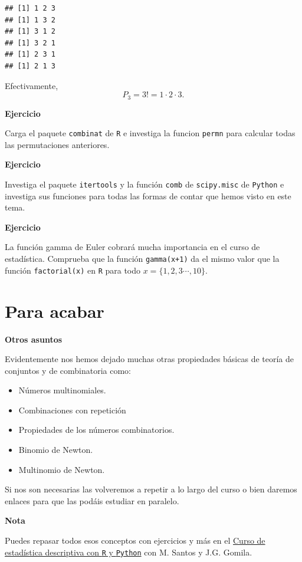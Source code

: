\documentclass[]{book}
\providecommand{\tightlist}{%
  \setlength{\itemsep}{0pt}\setlength{\parskip}{0pt}}
\begin{document}
\begin{verbatim}
## [1] 1 2 3
## [1] 1 3 2
## [1] 3 1 2
## [1] 3 2 1
## [1] 2 3 1
## [1] 2 1 3
\end{verbatim}

Efectivamente,
\[
P_3=3!=1\cdot  2\cdot 3.
\]

\textbf{Ejercicio}

Carga el paquete \texttt{combinat} de \texttt{R} e investiga la funcion \texttt{permn} para calcular todas las permutaciones anteriores.

\textbf{Ejercicio}

Investiga el paquete \texttt{itertools} y la función \texttt{comb} de \texttt{scipy.misc} de \texttt{Python} e investiga sus funciones para todas las formas de contar que hemos visto en este tema.

\textbf{Ejercicio}

La función gamma de Euler cobrará mucha importancia en el curso de estadística. Comprueba que la función \texttt{gamma(x+1)} da el mismo valor que la función \texttt{factorial(x)} en \texttt{R} para todo \(x = \{1,2,3\cdots,10\}\).

\hypertarget{para-acabar}{%
\section{Para acabar}\label{para-acabar}}

\textbf{Otros asuntos}

Evidentemente nos hemos dejado muchas otras propiedades básicas de teoría de conjuntos y de combinatoria como:

\begin{itemize}
\tightlist
\item
  Números multinomiales.
\item
  Combinaciones con repetición
\item
  Propiedades de los números combinatorios.
\item
  Binomio de Newton.
\item
  Multinomio de Newton.
\end{itemize}

Si nos son necesarias las volveremos a repetir a lo largo del curso o bien daremos enlaces para que las podáis estudiar en paralelo.

\textbf{Nota}

Puedes repasar todos esos conceptos con ejercicios y más en el \href{https://www.udemy.com/course/estadistica-descriptiva?couponCode=JB_PROMO_OFF}{Curso de estadística descriptiva con \texttt{R} y \texttt{Python}} con M. Santos y J.G. Gomila.
\end{document}
